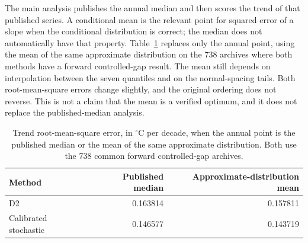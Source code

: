 The main analysis publishes the annual median and then scores the trend of that published series. A conditional mean is the relevant point for squared error of a slope when the conditional distribution is correct; the median does not automatically have that property. Table~\ref{tab:point-summary} replaces only the annual point, using the mean of the same approximate distribution on the 738 archives where both methods have a forward controlled-gap result. The mean still depends on interpolation between the seven quantiles and on the normal-spacing tails. Both root-mean-square errors change slightly, and the original ordering does not reverse. This is not a claim that the mean is a verified optimum, and it does not replace the published-median analysis.

\begin{table}[p]
\caption{Trend root-mean-square error, in $^{\circ}$C per decade, when the annual point is the published median or the mean of the same approximate distribution. Both use the 738 common forward controlled-gap archives.}
\label{tab:point-summary}
\centering
\begin{tabular}{lrr}
\toprule
Method & Published median & Approximate-distribution mean \\
\midrule
D2 & 0.163814 & 0.157811 \\
Calibrated stochastic & 0.146577 & 0.143719 \\
\bottomrule
\end{tabular}
\end{table}
